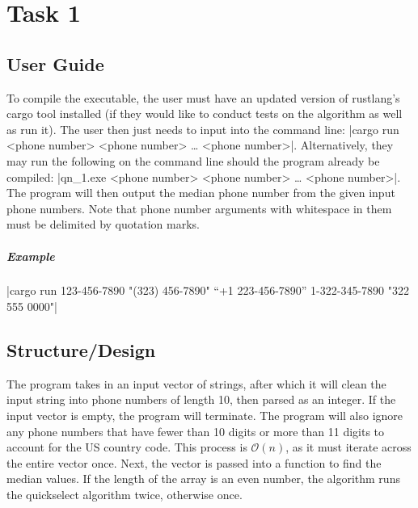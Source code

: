 \documentclass{report}
\begin{document}
\chapter{Task 1}
\section{User Guide}
To compile the executable, the user must have an updated version of rustlang's cargo tool installed (if they would like to conduct tests on the algorithm as well as run it). The user then just needs to input into the command line: |cargo run <phone number> <phone number> … <phone number>|. Alternatively, they may run the following on the command line should the program already be compiled: |qn_1.exe <phone number> <phone number> … <phone number>|. The program will then output the median phone number from the given input phone numbers. Note that phone number arguments with whitespace in them must be delimited by quotation marks.
\paragraph{Example} |cargo run 123-456-7890 "(323) 456-7890" “+1 223-456-7890” 1-322-345-7890 "322 555 0000"|

\section{Structure/Design}
The program takes in an input vector of strings, after which it will clean the input string into phone numbers of length 10, then parsed as an integer. If the input vector is empty, the program will terminate. The program will also ignore any phone numbers that have fewer than 10 digits or more than 11 digits to account for the US country code. This process is \(\mathcal{O}(n)\), as it must iterate across the entire vector once. Next, the vector is passed into a function to find the median values. If the length of the array is an even number, the algorithm runs the quickselect algorithm twice, otherwise once.
\end{document}

